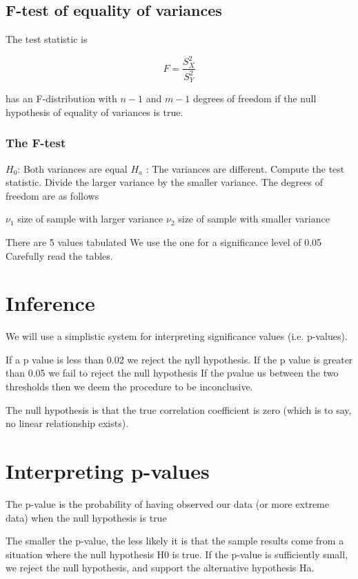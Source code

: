 \subsection{F-test of equality of variances}
The test statistic is

\begin{equation} F = \frac{S_X^2}{S_Y^2}\end{equation}

has an F-distribution with $n-1$ and $m-1$ degrees of freedom if the null hypothesis of equality of variances is true.


\subsubsection{The F-test}
$H_0$: Both variances are equal
$H_a$ : The variances are different.
Compute the test statistic.
Divide the larger variance by the smaller variance.
The degrees of freedom are as follows

$\nu_1$ size of sample with larger variance
$\nu_2$ size of sample with smaller variance

There are 5 values tabulated
We use the one for a significance level of 0.05
Carefully read the tables.

\section{Inference}

We will use a simplistic system for interpreting significance values (i.e. p-values).

If a p value is less than 0.02 we reject the nyll hypothesis.
If the p value is greater than 0.05 we fail to reject the null hypothesis
If the pvalue us between the two thresholds then we deem the procedure to be inconclusive. 

The null hypothesis is that the true correlation coefficient is zero (which is to say, no linear relationship exists). 




\section{Interpreting p-values}

The p-value is the probability of having observed our data (or more extreme data) when the null hypothesis is true 

The smaller the p-value, the less likely it is that the sample results come from a situation where the null hypothesis H0 is true. If the p-value is sufficiently small, we reject the null hypothesis, and support the alternative hypothesis Ha.

